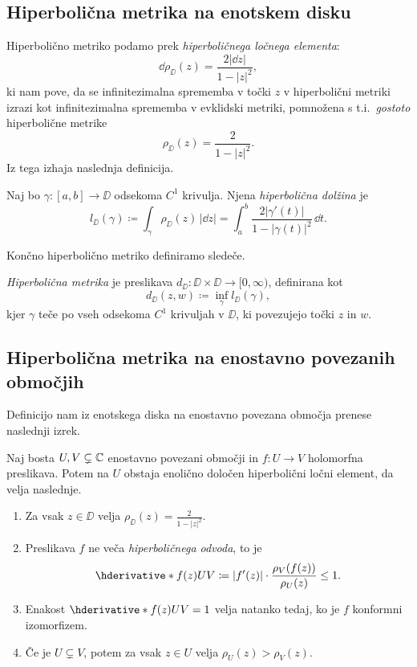 \subsection{Hiperbolična metrika na enotskem disku}

Hiperbolično metriko podamo prek \emph{hiperboličnega ločnega elementa}:
\[\dd \rho_{\DD} (z) = \frac{2 |\dd z|}{1 - |z|^2},\]
ki nam pove, da se infinitezimalna sprememba v točki \(z\) v hiperbolični metriki izrazi kot infinitezimalna sprememba v evklidski metriki, pomnožena s t.i.~\emph{gostoto} hiperbolične metrike
\[\rho_{\DD} (z) = \frac{2}{1 - |z|^2}.\]
Iz tega izhaja naslednja definicija.

\begin{definicija}
    Naj bo \(\gamma \colon [a, b] \to \DD\) odsekoma \(C^1\) krivulja. Njena \emph{hiperbolična dolžina} je
    \[l_{\DD} (\gamma) \coloneq \int_{\gamma} \rho_{\DD} (z) \, | \dd z | = \int_{a}^{b} \frac{2 | \gamma' (t) | }{1 - | \gamma (t) |^2} \, \dd t.\]
\end{definicija}

\noindent Končno hiperbolično metriko definiramo sledeče.

\begin{definicija}
    \emph{Hiperbolična metrika} je preslikava \(d_{\DD} \colon \DD \times \DD \to [0, \infty)\), definirana kot
    \[d_{\DD} (z, w) \coloneq \inf_{\gamma} l_{\DD} (\gamma),\]
    kjer \(\gamma\) teče po vseh odsekoma \(C^1\) krivuljah v \(\DD\), ki povezujejo točki \(z\) in \(w\).
\end{definicija}

\subsection{Hiperbolična metrika na enostavno povezanih območjih}

Definicijo nam iz enotskega diska na enostavno povezana območja prenese naslednji izrek.

\begin{izrek}[Pick] \label{thm:pick}
    Naj bosta \(U, V \subsetneq \mathbb C\) enostavno povezani območji in \(f \colon U \to V\) holomorfna preslikava. Potem na \(U\) obstaja enolično določen hiperbolični ločni element, da velja naslednje.
    \begin{enumerate}
        \item Za vsak \(z \in \DD\) velja \(\rho_{\DD} (z) = \frac{2}{1 - |z|^2}\).
        \item Preslikava \(f\) ne veča \emph{hiperboličnega odvoda}, to je \[\hder{f (z)}{U}{V} \coloneq |f' (z)| \cdot \frac{\rho_V (f (z))}{\rho_U (z)} \leq 1.\]
        \item Enakost \(\hder{f (z)}{U}{V} = 1\) velja natanko tedaj, ko je \(f\) konformni izomorfizem.
        \item Če je \(U \subsetneq V\), potem za vsak \(z \in U\) velja \(\rho_U (z) > \rho_V (z)\). 
    \end{enumerate}
\end{izrek}

